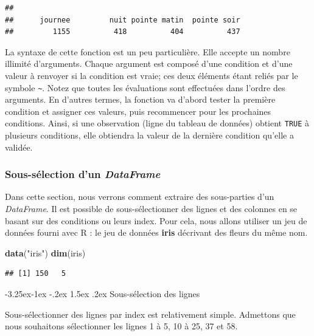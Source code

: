 \documentclass[
  11pt,
  french,
]{book}
\makeatletter
\newenvironment{Shaded}{\begin{snugshade}}{\end{snugshade}}
\newcommand{\KeywordTok}[1]{\textcolor[rgb]{0.13,0.29,0.53}{\textbf{#1}}}
\newcommand{\NormalTok}[1]{#1}
\newcommand{\StringTok}[1]{\textcolor[rgb]{0.31,0.60,0.02}{#1}}
\newenvironment{kframe}{%
\medskip{}
\setlength{\fboxsep}{.8em}
 \def\at@end@of@kframe{}%
 \ifinner\ifhmode%
  \def\at@end@of@kframe{\end{minipage}}%
  \begin{minipage}{\columnwidth}%
 \fi\fi%
 \def\FrameCommand##1{\hskip\@totalleftmargin \hskip-\fboxsep
 \colorbox{shadecolor}{##1}\hskip-\fboxsep
     \hskip-\linewidth \hskip-\@totalleftmargin \hskip\columnwidth}%
 \MakeFramed {\advance\hsize-\width
   \@totalleftmargin\z@ \linewidth\hsize
   \@setminipage}}%
 {\par\unskip\endMakeFramed%
 \at@end@of@kframe}
\renewenvironment{Shaded}{\begin{kframe}}{\end{kframe}}
\renewcommand\paragraph{\@startsection{paragraph}{4}{\z@}%
   {-3.25ex\@plus -1ex \@minus -.2ex}%
   {1.5ex \@plus .2ex}%
   {\normalfont\normalsize\bfseries}}
\makeatother
\begin{document}
\begin{verbatim}
## 
##      journee         nuit pointe matin  pointe soir 
##         1155          418          404          437
\end{verbatim}

La syntaxe de cette fonction est un peu particulière. Elle accepte un nombre illimité d'arguments. Chaque argument est composé d'une condition et d'une valeur à renvoyer si la condition est vraie; ces deux éléments étant reliés par le symbole \texttt{\textasciitilde{}}. Notez que toutes les évaluations sont effectuées dans l'ordre des arguments. En d'autres termes, la fonction va d'abord tester la première condition et assigner ces valeurs, puis recommencer pour les prochaines conditions. Ainsi, si une observation (ligne du tableau de données) obtient \texttt{TRUE} à plusieurs conditions, elle obtiendra la valeur de la dernière condition qu'elle a validée.

\hypertarget{sect01428}{%
\subsubsection{\texorpdfstring{Sous-sélection d'un \emph{DataFrame}}{Sous-sélection d'un DataFrame}}\label{sect01428}}

Dans cette section, nous verrons comment extraire des sous-parties d'un \emph{DataFrame}. Il est possible de sous-sélectionner des lignes et des colonnes en se basant sur des conditions ou leurs index. Pour cela, nous allons utiliser un jeu de données fourni avec R : le jeu de données \textbf{iris} décrivant des fleurs du même nom.

\begin{Shaded}
\begin{Highlighting}[]
\KeywordTok{data}\NormalTok{(}\StringTok{"iris"}\NormalTok{)}
\KeywordTok{dim}\NormalTok{(iris)}
\end{Highlighting}
\end{Shaded}

\begin{verbatim}
## [1] 150   5
\end{verbatim}

\hypertarget{sect014281}{%
\paragraph{Sous-sélection des lignes}\label{sect014281}}

Sous-sélectionner des lignes par index est relativement simple. Admettons que nous souhaitons sélectionner les lignes 1 à 5, 10 à 25, 37 et 58.
\end{document}
